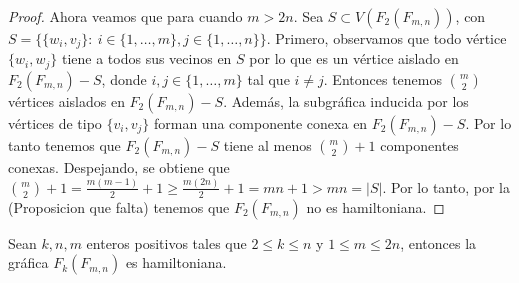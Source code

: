 \begin{proof}
    Ahora veamos que para cuando $m>2n$. Sea $S \subset V(F_2(F_{m,n}))$, con
    $S=\{\{w_i,v_j\} \colon\ i \in \{1,\dots,m\},j\in\{1,\dots,n\}\}$. Primero,
    observamos que todo v\'ertice $\{w_i,w_j\}$ tiene a todos sus vecinos en $S$
    por lo que es un v\'ertice aislado en $F_2(F_{m,n})-S$, donde $i,j \in
    \{1,\dots,m\}$ tal que $i \neq j$. Entonces tenemos $\binom{m}{2}$
    v\'ertices aislados en $F_2(F_{m,n})-S$. Adem\'as, la subgr\'afica inducida
    por los v\'ertices de tipo $\{v_i,v_j\}$ forman una componente conexa en
    $F_2(F_{m,n})-S$. Por lo tanto tenemos que $F_2(F_{m,n})-S$ tiene al menos
    $\binom{m}{2} + 1$ componentes conexas. Despejando, se obtiene que
    $\binom{m}{2} + 1 = \frac{m(m-1)}{2} + 1 \geq \frac{m(2n)}{2} + 1 = mn + 1 >
    mn = |S|$. Por lo tanto, por la (Proposicion que falta) tenemos que
    $F_2(F_{m,n})$ no es hamiltoniana.

\end{proof}


    \begin{teorema}
        Sean $k, n, m$ enteros positivos tales que $2 \leq k \leq n$ y $1 \leq m
        \leq 2n$, entonces la gr\'afica $F_k(F_{m,n})$ es hamiltoniana.
    \end{teorema}

